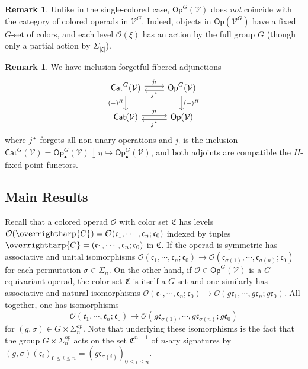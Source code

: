 \documentclass[a4paper,10pt
,draft
]{article}%
\numberwithin{equation}{section}
\numberwithin{figure}{section}
\theoremstyle{definition} %
\newtheorem{remark}[equation]{Remark}%
\newcommand{\into}{\hookrightarrow}%
\newcommand{\vect}[1]{\text{\overrightharp{\ensuremath{#1}}}}
\newcommand{\Cat}{\mathsf{Cat}}
\newcommand{\Op}{\mathsf{Op}}%
\newcommand{\V}{\ensuremath{\mathcal V}}
\renewcommand{\O}{\ensuremath{\mathcal O}}
\newcommand{\1}{\ensuremath{\mathbbm 1}}%
\begin{document}
\begin{remark}
      Unlike in the single-colored case, $\Op^G(\V)$ does \textit{not} coincide with the category of colored operads in $\V^G$.
      Indeed, objects in $\Op(\V^G)$ have a fixed $G$-set of colors,
      and each level $\O(\xi)$ has an action by the full group $G$
      (though only a partial action by $\Sigma_{|\xi|}$).
\end{remark}



\begin{remark}
We have inclusion-forgetful fibered adjunctions
\begin{equation}\label{JSTAR_CAT_EQ}
\begin{tikzcd}
	\Cat^{G}(\V)
	\arrow[shift left]{r}{j_!}
	\arrow[d, "{(-)^H}"']
&
	\Op^{G}(\V)
	\arrow[shift left]{l}{j^{\**}}
	\arrow{d}{(-)^H}
\\
	\Cat(\V)
	\arrow[shift left]{r}{j_!}
&
	\Op(\V)
	\arrow[shift left]{l}{j^{\**}}
\end{tikzcd}
\end{equation}
where $j^{\**}$ forgets all non-unary operations and
$j_!$ is the inclusion $\Cat^G(\V) = \Op^G_\bullet(\V) \downarrow \eta \into \Op^G_\bullet(\V)$,
and both adjoints are compatible the $H$-fixed point functors.
\end{remark}





\subsection{Main Results}


Recall that a colored operad $\O$
with color set $\mathfrak{C}$ has levels 
$
\O(\vect{C})=
\O(\mathfrak{c}_1,\cdots,\mathfrak{c}_n;\mathfrak{c}_0)$
indexed by tuples 
$\vect{C} = (\mathfrak{c}_1,\cdots,\mathfrak{c}_n;\mathfrak{c}_0)$
in $\mathfrak{C}$.
If the operad is symmetric has associative and unital isomorphisms
$
\O(\mathfrak{c}_1,\cdots,\mathfrak{c}_n;\mathfrak{c}_0) \to 
\O(\mathfrak{c}_{\sigma(1)},\cdots,\mathfrak{c}_{\sigma(n)};\mathfrak{c}_0)
$
for each permutation $\sigma \in \Sigma_n$.
On the other hand, if 
$\O \in \mathsf{Op}^G(\V)$
is a $G$-equivariant operad, 
the color set $\mathfrak{C}$ is itself a $G$-set
and one similarly has associative and natural isomorphisms
$
\O(\mathfrak{c}_1,\cdots,\mathfrak{c}_n;\mathfrak{c}_0) \to 
\O(g\mathfrak{c}_{1},\cdots,g\mathfrak{c}_{n};g\mathfrak{c}_0)
$.
All together, one has isomorphisms
\[
\O(\mathfrak{c}_1,\cdots,\mathfrak{c}_n;\mathfrak{c}_0)
\to 
\O(g \mathfrak{c}_{\sigma(1)},\cdots,g \mathfrak{c}_{\sigma(n)};g\mathfrak{c}_0)
\]
for $(g,\sigma) \in G \times \Sigma_n^{op}$.
Note that underlying these isomorphisms is the fact that
the group
$G \times \Sigma_n^{op}$
acts on the set $\mathfrak{C}^{n+1}$ of $n$-ary signatures by 
$(g,\sigma) (\mathfrak{c}_i)_{0\leq i \leq n}
= (g \mathfrak{c}_{\sigma(i)})_{0\leq i \leq n}$.
\end{document}
